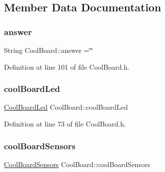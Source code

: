 \subsection{Member Data Documentation}
\mbox{\label{class_cool_board_a7b835fafd449e5282f7f91d787a2dc15}} 
\subsubsection{\texorpdfstring{answer}{answer}}
{\footnotesize\ttfamily String Cool\+Board\+::answer =\char`\"{}\char`\"{}\hspace{0.3cm}{\ttfamily [private]}}



Definition at line 101 of file Cool\+Board.\+h.

\mbox{\label{class_cool_board_a1b1d3c684a5baa56b08486e192fd8e97}} 
\subsubsection{\texorpdfstring{cool\+Board\+Led}{coolBoardLed}}
{\footnotesize\ttfamily \hyperlink{class_cool_board_led}{Cool\+Board\+Led} Cool\+Board\+::cool\+Board\+Led\hspace{0.3cm}{\ttfamily [private]}}



Definition at line 73 of file Cool\+Board.\+h.

\mbox{\label{class_cool_board_af102be5288bd7f7a8e59b13f86e26a00}} 
\subsubsection{\texorpdfstring{cool\+Board\+Sensors}{coolBoardSensors}}
{\footnotesize\ttfamily \hyperlink{class_cool_board_sensors}{Cool\+Board\+Sensors} Cool\+Board\+::cool\+Board\+Sensors\hspace{0.3cm}{\ttfamily [private]}}



